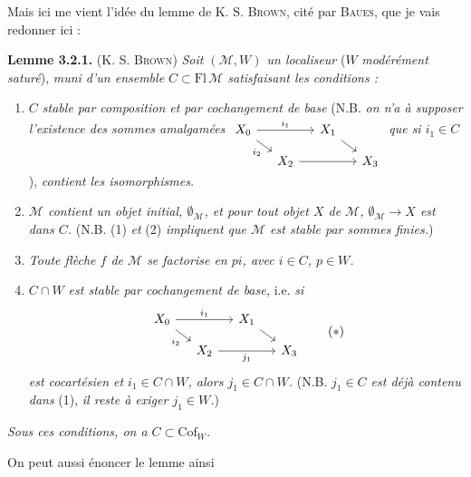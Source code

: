 \documentclass[11pt]{article}
\newcommand{\printedpage}[1]{\marginpar{\footnotesize p.~#1}}
\newcommand{\msp}[1]{\marginpar{\footnotesize [#1]}}
\newcommand{\Cof}{\mathrm{Cof}}
\newcommand{\Fl}{\mathrm{Fl}}
\begin{document}
\msp{page 20}Mais ici me vient l'idée du lemme de K. S. \textsc{Brown}, cité par \textsc{Baues}, que je vais redonner ici :

\textbf{Lemme 3.2.1.} (K. S. \textsc{Brown}) \textit{Soit $(\mathcal{M}, W)$ un localiseur} ($W$ \textit{modérément saturé}), \textit{muni d'un ensemble $C \subset \Fl\,\mathcal{M}$ satisfaisant les conditions :}
\begin{enumerate}
\item[1)] \textit{$C$ stable par composition et par cochangement de base} (N.B. \textit{on n'a à supposer l'existence des sommes amalgamées}
$\begin{tikzcd}[ampersand replacement=\&, baseline=(\tikzcdmatrixname-1-1.base), row sep=small, column sep=small]
X_0 \arrow[rr, "i_1"] \arrow[dr, "i_2"'] \& \& X_1 \arrow[dr] \& \\
\& X_2 \arrow[rr] \& \& X_3
\end{tikzcd}$
\textit{que si $i_1 \in C$}), \textit{contient les isomorphismes.}
\item[2)] \textit{$\mathcal{M}$ contient un objet initial, $\emptyset_{\mathcal{M}}$, et pour tout objet $X$ de $\mathcal{M}$, $\emptyset_{\mathcal{M}} \longrightarrow X$ est dans $C$.} (N.B. (1) \textit{et} (2) \textit{impliquent que $\mathcal{M}$ est stable par sommes finies.})
\item[3)] \textit{Toute flèche $f$ de $\mathcal{M}$ se factorise en $pi$, avec $i \in C$, $p \in W$.}
\item[4)] \textit{$C \cap W$ est stable par cochangement de base,} i.e. \textit{si}
\[
\begin{tikzcd}[ampersand replacement=\&, row sep=small, column sep=small]
X_0 \arrow[rr, "i_1"] \arrow[dr, "i_2"'] \& \& X_1 \arrow[dr] \& \\
\& X_2 \arrow[rr, "j_1"'] \& \& X_3
\end{tikzcd}
\tag*{$(*)$}
\]
\printedpage{15}
\textit{est cocartésien et $i_1 \in C \cap W$, alors $j_1 \in C \cap W$.} (N.B. \textit{$j_1 \in C$ est déjà contenu dans} (1), \textit{il reste à exiger $j_1 \in W$.})
\end{enumerate}
\textit{Sous ces conditions, on a $C \subset \Cof_W$.}

On peut aussi énoncer le lemme ainsi
\end{document}
